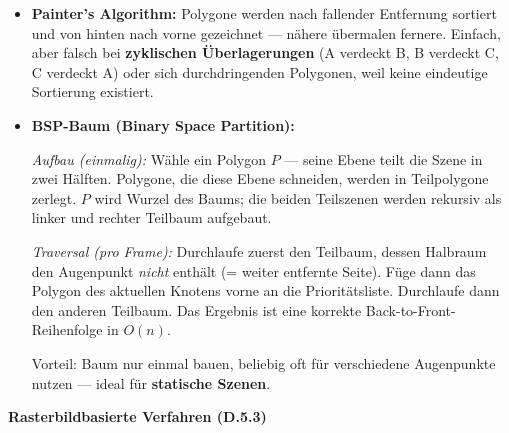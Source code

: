 \documentclass[12pt, a4paper]{article}
\begin{document}
\begin{itemize}
  \item \textbf{Painter's Algorithm:} Polygone werden nach fallender Entfernung sortiert und von hinten nach vorne gezeichnet — nähere übermalen fernere. Einfach, aber falsch bei \textbf{zyklischen Überlagerungen} (A verdeckt B, B verdeckt C, C verdeckt A) oder sich durchdringenden Polygonen, weil keine eindeutige Sortierung existiert.

  \item \textbf{BSP-Baum (Binary Space Partition):}

  \textit{Aufbau (einmalig):} Wähle ein Polygon $P$ — seine Ebene teilt die Szene in zwei Hälften. Polygone, die diese Ebene schneiden, werden in Teilpolygone zerlegt. $P$ wird Wurzel des Baums; die beiden Teilszenen werden rekursiv als linker und rechter Teilbaum aufgebaut.

  \textit{Traversal (pro Frame):} Durchlaufe zuerst den Teilbaum, dessen Halbraum den Augenpunkt \textit{nicht} enthält (= weiter entfernte Seite). Füge dann das Polygon des aktuellen Knotens vorne an die Prioritätsliste. Durchlaufe dann den anderen Teilbaum. Das Ergebnis ist eine korrekte Back-to-Front-Reihenfolge in $O(n)$.

  Vorteil: Baum nur einmal bauen, beliebig oft für verschiedene Augenpunkte nutzen — ideal für \textbf{statische Szenen}.
\end{itemize}

\textbf{Rasterbildbasierte Verfahren (D.5.3)}
\end{document}
